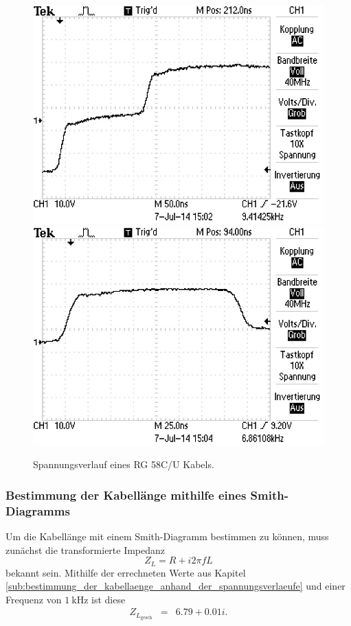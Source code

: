 \begin{figure}
\centering
	\includegraphics[width = 12cm]{data/c/ALL0011/F0011TEK.jpg}
	\includegraphics[width = 12cm]{data/c/ALL0012/F0012TEK.jpg}
	\caption{Spannungsverlauf eines RG 58C/U Kabels.}
	\label{fig_zeit3}
\end{figure}

\FloatBarrier
\subsubsection{Bestimmung der Kabellänge mithilfe eines Smith-Diagramms} %
\label{sub:bestimmung_der_kabellaenge_mithilfe_eines_smith_diagramms}

Um die Kabellänge mit einem Smith-Diagramm bestimmen zu können, muss zunächst die transformierte Impedanz 
\begin{equation*}
	Z_L = R + i 2 \pi f L
\end{equation*}
bekannt sein.
Mithilfe der errechneten Werte aus Kapitel \ref{sub:bestimmung_der_kabellaenge_anhand_der_spannungsverlaeufe} und einer Frequenz von $\SI{1}{\kilo\hertz}$ ist diese
\begin{eqnarray*}
	Z_{L_\text{gesch}} &=& 6.79 + 0.01i.
\end{eqnarray*}

